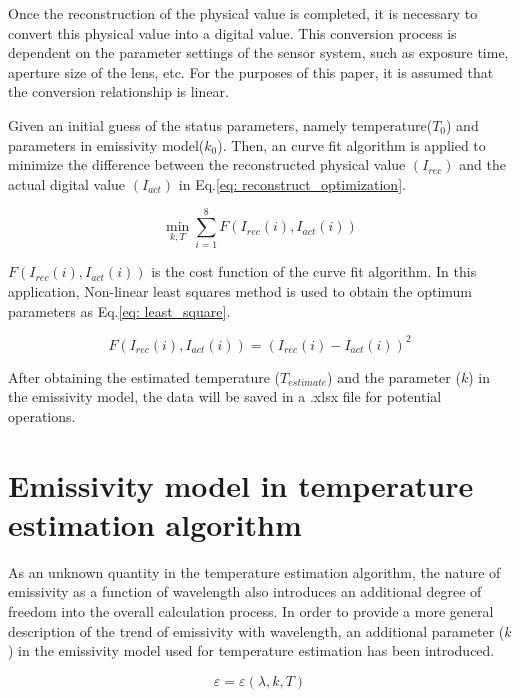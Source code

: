 Once the reconstruction of the physical value is completed, it is 
necessary to convert this physical value into a digital value. This 
conversion process is dependent on the parameter settings of the sensor 
system, such as exposure time, aperture size of the lens, etc. For the 
purposes of this paper, it is assumed that the conversion relationship 
is linear.


Given an initial guess of the status parameters, namely 
temperature($T_0$) and parameters in emissivity model($k_0$). Then, an curve fit 
algorithm is applied to minimize the difference between the reconstructed physical value $(I_{rec})$ 
and the actual digital value $(I_{act})$ in Eq.\ref{eq: reconstruct_optimization}.

\begin{equation}
    \label{eq: reconstruct_optimization}
    \min_{k, T}\sum_{i=1}^{8}  F(I_{rec}(i), I_{act}(i))
\end{equation} 

$F(I_{rec}(i), I_{act}(i))$ is the cost function of the curve fit algorithm. In this 
application, Non-linear least squares method is used to obtain the optimum parameters 
as Eq.\ref{eq: least_square}.

\begin{equation}
    \label{eq: least_square}
    F(I_{rec}(i), I_{act}(i)) = (I_{rec}(i) - I_{act}(i))^2
\end{equation}


After obtaining the estimated temperature ($T_{estimate}$) and the parameter ($k$) 
in the emissivity model, the data will be saved in a .xlsx file for 
potential operations.


\section{Emissivity model in temperature estimation algorithm}%
As an unknown quantity in the temperature estimation algorithm, the nature of emissivity 
as a function of wavelength also introduces an additional degree of freedom 
into the overall calculation process. In order to provide a more general description of 
the trend of emissivity with wavelength, an additional parameter ($k$) in the 
emissivity model used for temperature estimation has been introduced.

\begin{equation}
    \label{eq: emi}
    \varepsilon = \varepsilon(\lambda, k, T)
\end{equation}


